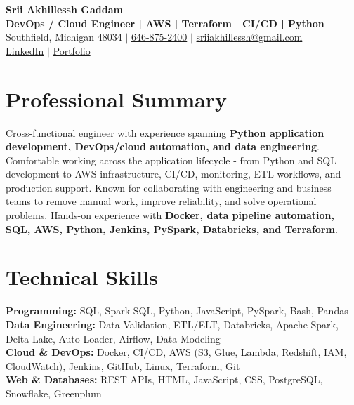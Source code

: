 \documentclass[letterpaper,10pt]{article}
\begin{document}
\fontsize{9.35pt}{10.45pt}\selectfont

\begin{center}
    {\LARGE \textbf{Srii Akhillessh Gaddam}} \\[-1pt]
    \textbf{DevOps / Cloud Engineer | AWS | Terraform | CI/CD | Python} \\[2pt]
    Southfield, Michigan 48034 $|$
    \href{tel:6468752400}{646-875-2400} $|$
    \href{mailto:sriiakhillessh@gmail.com}{sriiakhillessh@gmail.com} \\[1pt]
    \href{https://www.linkedin.com/in/srii-akhiilessh-gaddam-b48668191/}{LinkedIn} $|$
    \href{https://sriiakhillesshg.github.io/portfolio/}{Portfolio}
\end{center}
\vspace{-8pt}

\section{Professional Summary}
\small{Cross-functional engineer with experience spanning \textbf{Python application development, DevOps/cloud automation, and data engineering}. Comfortable working across the application lifecycle - from Python and SQL development to AWS infrastructure, CI/CD, monitoring, ETL workflows, and production support. Known for collaborating with engineering and business teams to remove manual work, improve reliability, and solve operational problems. Hands-on experience with \textbf{Docker, data pipeline automation, SQL, AWS, Python, Jenkins, PySpark, Databricks, and Terraform}.}

\section{Technical Skills}
\small{
\textbf{Programming:} SQL, Spark SQL, Python, JavaScript, PySpark, Bash, Pandas \\
\textbf{Data Engineering:} Data Validation, ETL/ELT, Databricks, Apache Spark, Delta Lake, Auto Loader, Airflow, Data Modeling \\
\textbf{Cloud \& DevOps:} Docker, CI/CD, AWS (S3, Glue, Lambda, Redshift, IAM, CloudWatch), Jenkins, GitHub, Linux, Terraform, Git \\
\textbf{Web \& Databases:} REST APIs, HTML, JavaScript, CSS, PostgreSQL, Snowflake, Greenplum
}
\end{document}
